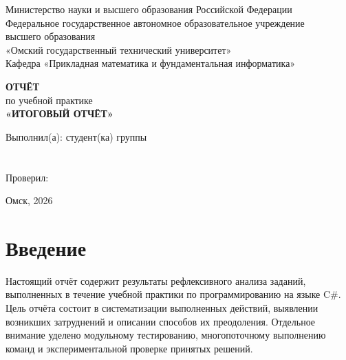 \documentclass[14pt,a4paper]{extarticle}
\newcommand{\StudentName}{\underline{\hspace{7cm}}}
\newcommand{\StudentGroup}{\underline{\hspace{4cm}}}
\begin{document}
\begin{titlepage}
    \begin{center}
        Министерство науки и высшего образования Российской Федерации\\
        Федеральное государственное автономное образовательное учреждение\\
        высшего образования\\
        «Омский государственный технический университет»\\[0.4cm]
        Кафедра «Прикладная математика и фундаментальная информатика»
    \end{center}

    \vfill

    \begin{center}
        \textbf{ОТЧЁТ}\\[0.3cm]
        по учебной практике\\[0.7cm]
        \textbf{«ИТОГОВЫЙ ОТЧЁТ»}
    \end{center}

    \vfill

    \begin{flushright}
        \begin{minipage}{0.52\textwidth}
            Выполнил(а): студент(ка) группы\\
            \StudentGroup\\[0.35cm]
            \StudentName\\[0.7cm]
            Проверил: \underline{\hspace{5.6cm}}
        \end{minipage}
    \end{flushright}

    \vfill

    \begin{center}
        Омск, 2026
    \end{center}
\end{titlepage}

\setcounter{page}{2}
\tableofcontents
\clearpage

\section*{Введение}

Настоящий отчёт содержит результаты рефлексивного анализа заданий, выполненных в течение учебной практики по программированию на языке C\#. Цель отчёта состоит в систематизации выполненных действий, выявлении возникших затруднений и описании способов их преодоления. Отдельное внимание уделено модульному тестированию, многопоточному выполнению команд и экспериментальной проверке принятых решений.
\end{document}
